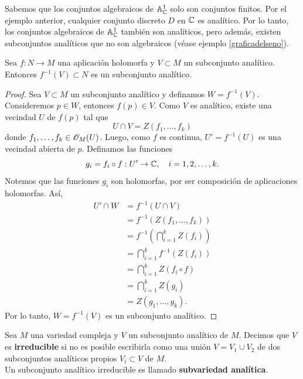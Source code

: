     \begin{remark}
    	Sabemos que los conjuntos algebraicos de $\mathbb{A}^1_{\mathbb{C}}$ solo son conjuntos finitos. Por el ejemplo anterior, cualquier conjunto discreto $D$ en $\mathbb{C}$ es analítico. Por lo tanto, los conjuntos algebraicos de  $\mathbb{A}^1_{\mathbb{C}}$ también son analíticos, pero además, existen subconjuntos analíticos que no son algebraicos (véase ejemplo \ref{graficadelseno}).
    \end{remark}
    
    \begin{lemma}\label{preimagen analitico}
    	Sea $f:N\to M$ una aplicación holomorfa y $V\subset M$ un subconjunto analítico. Entonces $f^{-1}(V)\subset N$ es un subconjunto analítico.
    \end{lemma}
    \begin{proof}
    	Sea $V\subset M$ un subconjunto analítico y definamos $W=f^{-1}(V)$. Consideremos $p\in W$, entonces $f(p)\in V$. Como $V$ es analítico, existe una vecindad $U$ de $f(p)$ tal que
    	\begin{equation*}
    		U\cap V=Z(f_1,\dots,f_k)
    	\end{equation*} 
    	donde $f_1,\dots,f_k\in\mathscr{O}_M(U)$. Luego, como $f$ es continua, $U'=f^{-1}(U)$ es una vecindad abierta de $p$. Definamos las funciones
    	\begin{equation*}
    		g_i=f_i\circ f:U'\to\mathbb{C},\quad i=1,2,\dots,k.
    	\end{equation*}
    	Notemos que las funciones $g_i$ son holomorfas, por ser composición de aplicaciones holomorfas. Así, 
    	\begin{align*}
    		U'\cap W&=f^{-1}(U\cap V)\\
    		&=f^{-1}(Z(f_1,\dots,f_k))\\
    		&=f^{-1}\left(\bigcap_{i=1}^k Z(f_i) \right)\\
    		&= \bigcap_{i=1}^k f^{-1}(Z(f_i))\\
    		&=\bigcap_{i=1}^k Z(f_i\circ f)\\
    		&=\bigcap_{i=1}^k Z(g_i)\\
    		&=Z(g_1,\dots,g_k).
    	\end{align*}
    	Por lo tanto, $W=f^{-1}(V)$ es un subconjunto analítico.
    \end{proof}
    
    \begin{definition}
    	Sea $M$ una variedad compleja y $V$ un subconjunto analítico de $M$. Decimos que $V$ es \textbf{irreducible} si no es posible escribirla como una unión $V=V_1\cup V_2$ de dos subconjuntos analíticos propios $V_i\subset V$ de $M$.\\
    	Un subconjunto analítico irreducible es llamado \textbf{subvariedad analítica}.
    \end{definition}
    
